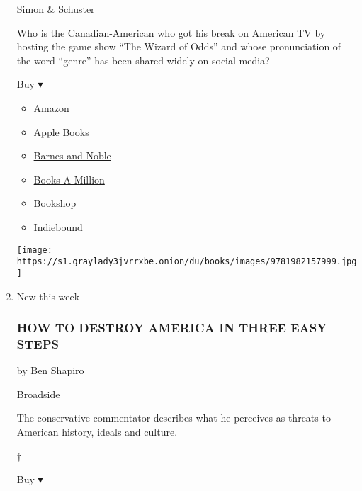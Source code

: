 \begin{enumerate}
  Simon \& Schuster

  Who is the Canadian-American who got his break on American TV by
  hosting the game show ``The Wizard of Odds'' and whose pronunciation
  of the word ``genre'' has been shared widely on social media?

  Buy ▾

  \begin{itemize}
  \tightlist
  \item
    \href{https://www.amazon.com/dp/1982157992?tag=NYTBSREV-20\&tag=NYTBS-20}{Amazon}
  \item
    \href{https://du-gae-books-dot-nyt-du-prd.appspot.com/buy?title=THE+ANSWER+IS+...\&author=Alex+Trebek}{Apple
    Books}
  \item
    \href{https://www.anrdoezrs.net/click-7990613-11819508?url=https\%3A\%2F\%2Fwww.barnesandnoble.com\%2Fw\%2F\%3Fean\%3D9781982157999}{Barnes
    and Noble}
  \item
    \href{https://www.anrdoezrs.net/click-7990613-35140?url=https\%3A\%2F\%2Fwww.booksamillion.com\%2Fp\%2FTHE\%2BANSWER\%2BIS\%2B...\%2FAlex\%2BTrebek\%2F9781982157999}{Books-A-Million}
  \item
    \href{https://bookshop.org/a/3546/9781982157999}{Bookshop}
  \item
    \href{https://www.indiebound.org/book/9781982157999?aff=NYT}{Indiebound}
  \end{itemize}

  \texttt{[image: https://s1.graylady3jvrrxbe.onion/du/books/images/9781982157999.jpg]}
\item
  New this week

  \hypertarget{how-to-destroy-america-in-three-easy-steps}{%
  \subsubsection{HOW TO DESTROY AMERICA IN THREE EASY
  STEPS}\label{how-to-destroy-america-in-three-easy-steps}}

  by Ben Shapiro

  Broadside

  The conservative commentator describes what he perceives as threats to
  American history, ideals and culture.

  †

  Buy ▾


\end{enumerate}
